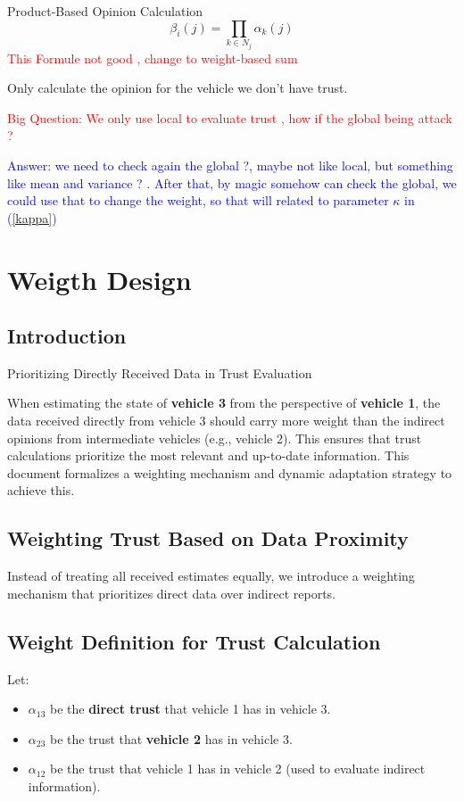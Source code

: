 \documentclass[letterpaper, 10pt, conference]{ieeeconf}  %
\def\eqref#1{(\ref{#1})}
\begin{document}
Product-Based Opinion Calculation
\begin{equation}
    \beta_i(j) = \prod_{k \in N_j} \alpha_k(j)
\end{equation}
\textcolor{red}{This Formule not good , change to weight-based sum}

Only calculate the opinion for the vehicle we don't have trust. 

\textcolor{red}{Big Question: We only use local to evaluate trust , how if the global being attack ? }

\textcolor{blue}{Answer: we need to check again the global ?, maybe not like local, but something like mean and variance ? . After that, by magic somehow can check the global, we could use that to change the weight, so that will related to parameter $\kappa$ in \eqref{kappa} }

\section{Weigth Design}\label{Weigth_Design}



\subsection{Introduction}
Prioritizing Directly Received Data in Trust Evaluation


When estimating the state of \textbf{vehicle 3} from the perspective of \textbf{vehicle 1}, the data received directly from vehicle 3 should carry more weight than the indirect opinions from intermediate vehicles (e.g., vehicle 2). This ensures that trust calculations prioritize the most relevant and up-to-date information. This document formalizes a weighting mechanism and dynamic adaptation strategy to achieve this.



\subsection{Weighting Trust Based on Data Proximity}
Instead of treating all received estimates equally, we introduce a weighting mechanism that prioritizes direct data over indirect reports.

\subsection{Weight Definition for Trust Calculation}
Let:
\begin{itemize}
    \item \( \alpha_{13} \) be the \textbf{direct trust} that vehicle 1 has in vehicle 3.
    \item \( \alpha_{23} \) be the trust that \textbf{vehicle 2} has in vehicle 3.
    \item \( \alpha_{12} \) be the trust that vehicle 1 has in vehicle 2 (used to evaluate indirect information).
\end{itemize}
\end{document}
